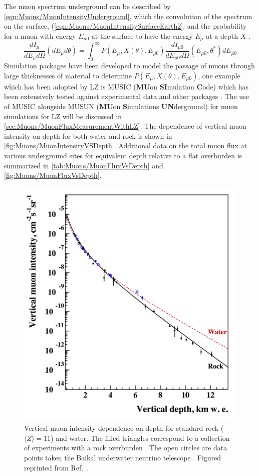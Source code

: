 The muon spectrum underground can be described by \autoref{eqn:Muons/MuonIntensityUnderground}, which the convolution of the spectrum on the surface, (\autoref{eqn:Muons/MuonIntensitySurfaceEarth2}, and the probability for a muon with energy $E_{\mu 0}$ at the surface to have the energy $E_\mu$ at a depth $X$ \cite{musun}.
\begin{equation}\label{eqn:Muons/MuonIntensityUnderground}
    \frac{dI_\mu}{dE_\mu d\Omega}(dE_\mu d\theta)=\int^\infty_0P(E_\mu,X(\theta),E_{\mu0})\frac{dI_{\mu0}}{dE_{\mu0}d\Omega}(E_{\mu0},\theta^*)dE_{\mu 0}
\end{equation}
Simulation packages have been developed to model the passage of muons through large thicknesses of material to determine $P(E_\mu,X(\theta),E_{\mu0})$, one example which has been adopted by LZ is MUSIC (\textbf{MU}on \textbf{SI}mulation \textbf{C}ode) which has been extensively tested against experimental data and other packages \cite{musun,LVD:1998lir,PhysRevD.60.112001,Tang:2006uu,MACRO:2003qix}. The use of MUSIC alongside MUSUN (\textbf{MU}on \textbf{S}imulations \textbf{UN}derground) for muon simulations for LZ will be discussed in \autoref{sec:Muons/MuonFluxMeasurementWithLZ}.
The dependence of vertical muon intensity on depth for both water and rock is shown in \autoref{fig:Muons/MuonIntensityVSDepth}. Additional data on the total muon flux at various underground sites for equivalent depth relative to a flat overburden is summarized in \autoref{tab:Muons/MuonFluxVsDepth} and \autoref{fig:Muons/MuonFluxVsDepth}.
\begin{figure}[ht!]
    \centering
    \includegraphics[width=0.6\linewidth]{figures/Muons/MuonIntensityVSVertDepth.png}
    \caption{Vertical muon intensity dependence on depth for standard rock ($\langle Z\rangle=11$) and water. The filled triangles correspond to a collection of experiments with a rock overburden \cite{Kozyarivsky:1988gxn}. The open circles are data points taken the Baikal underwater neutrino telescope \cite{BAIKAL:1997iok}. Figured reprinted from Ref.~\cite{dwoodward:thesis}.}
    \label{fig:Muons/MuonIntensityVSDepth}
\end{figure}
